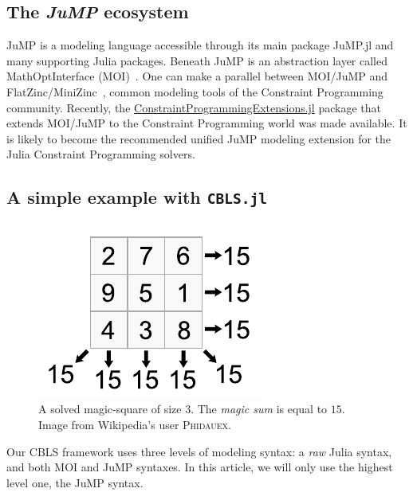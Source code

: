 \documentclass{juliacon}
\begin{document}
\subsection{The \emph{JuMP} ecosystem} %
\label{subsec:jump}

JuMP is a modeling language accessible through its main package
JuMP.jl \cite{DunningHuchetteLubin2017} and many supporting Julia packages. Beneath JuMP is an
abstraction layer called MathOptInterface
(MOI)~\cite{MathOptInterface-2021}. One can make a parallel
between MOI/JuMP and FlatZinc/MiniZinc~\cite{nethercote2007minizinc},
common modeling tools of the Constraint Programming community.
Recently, the
\href{https://github.com/dourouc05/ConstraintProgrammingExtensions.jl}{ConstraintProgrammingExtensions.jl}
package that extends MOI/JuMP to the Constraint Programming world was
made available. It is likely to become the recommended unified JuMP
modeling extension for the Julia Constraint Programming solvers.

\subsection{A simple example with \texttt{CBLS.jl}}
\label{subsec:example}

\begin{figure}[t]
  \centerline{\includegraphics[page=1, width=.75\columnwidth]{figs/magicsquare.pdf}}
  \caption{A solved magic-square of size $3$. The \emph{magic sum} is equal to $15$. Image from Wikipedia's user \textsc{Phidauex}.}
  \label{fig:magicsquare}
\end{figure}

Our CBLS framework uses three levels of modeling syntax: a \emph{raw} Julia syntax, and both MOI and JuMP syntaxes. In this article, we will only use the highest level one, the JuMP syntax.
\end{document}
